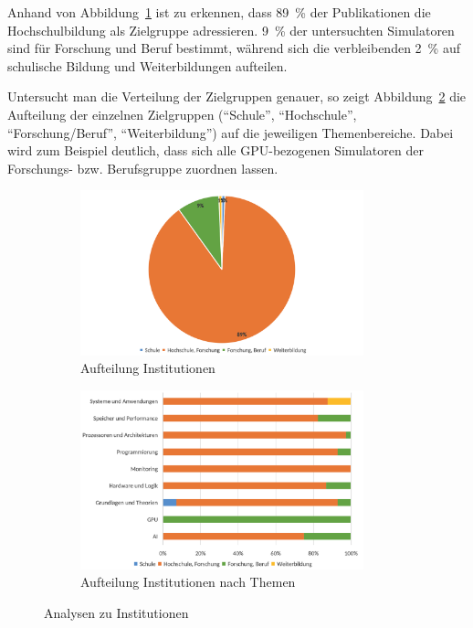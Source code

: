 Anhand von Abbildung~\ref{fig:9-institution} ist zu erkennen, dass 89~\% der Publikationen die Hochschulbildung als Zielgruppe adressieren. 9~\% der untersuchten Simulatoren sind für Forschung und Beruf bestimmt, während sich die verbleibenden 2~\% auf schulische Bildung und Weiterbildungen aufteilen.

Untersucht man die Verteilung der Zielgruppen genauer, so zeigt Abbildung~\ref{fig:10-institution-themen} die Aufteilung der einzelnen Zielgruppen (\enquote{Schule}, \enquote{Hochschule}, \enquote{Forschung/Beruf}, \enquote{Weiterbildung}) auf die jeweiligen Themenbereiche. Dabei wird zum Beispiel deutlich, dass sich alle GPU-bezogenen Simulatoren der Forschungs- bzw. Berufsgruppe zuordnen lassen.

\begin{figure}[!htbp]
    \centering
    \begin{subfigure}[b]{0.48\textwidth}
        \centering
        \includegraphics[width=0.90\textwidth]{graphics_lit/9-institution.png}
        \caption{Aufteilung Institutionen}
        \label{fig:9-institution}
    \end{subfigure}
    \hfill
    \begin{subfigure}[b]{0.48\textwidth}
        \centering
        \includegraphics[width=0.90\textwidth]{graphics_lit/10-institution-themen.png}
        \caption{Aufteilung Institutionen nach Themen}
        \label{fig:10-institution-themen}
    \end{subfigure}
    \caption{Analysen zu Institutionen}
    \label{fig:institution-analysen}
\end{figure}

